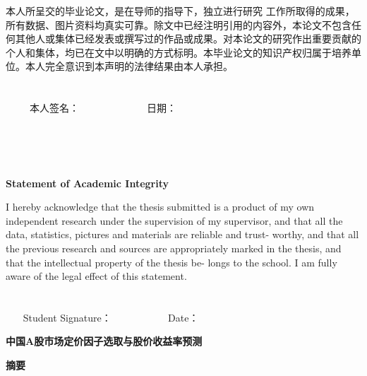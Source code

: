 \documentclass[12pt]{article} %
\begin{document}
	\begin{large}
	本人所呈交的毕业论文，是在导师的指导下，独立进行研究 工作所取得的成果，所有数据、图片资料均真实可靠。除文中已经注明引用的内容外，本论文不包含任何其他人或集体已经发表或撰写过的作品或成果。对本论文的研究作出重要贡献的个人和集体，均已在文中以明确的方式标明。本毕业论文的知识产权归属于培养单位。本人完全意识到本声明的法律结果由本人承担。\\ \\ \\
	$~~~~~~~~~~~$本人签名：$~~~~~~~~~~~~~~~~~~~~~~~~~~~~~~~$日期：
	\end{large}
	~\\ \\ \\
	\begin{center}
		\Large \textbf{Statement of Academic Integrity}
	\end{center}

	\begin{large}
	I hereby acknowledge that the thesis submitted is a product of my own independent research under the supervision of my supervisor, and that all the data, statistics, pictures and materials are reliable and trust- worthy, and that all the previous research and sources are appropriately marked in the thesis, and that the intellectual property of the thesis be- longs to the school. I am fully aware of the legal effect of this statement. \\ \\ \\
	$~~~~~~~~$Student Signature：$~~~~~~~~~~~~~~~~~~~~~~~~~~$Date：
	\end{large}
	\newpage
	\thispagestyle{empty}
	\begin{center}
		\LARGE \textbf{中国A股市场定价因子选取与股价收益率预测}
	\end{center}
	\begin{center}
		\textbf{摘要}
	\end{center}
	
	
\end{document}
